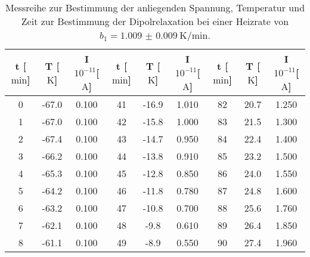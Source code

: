 \begin{table}
    \centering
    \caption{Messreihe zur Bestimmung der anliegenden Spannung, \newline Temperatur und Zeit zur Bestimmung der Dipolrelaxation bei einer Heizrate von $b_1 = \SI{1.009(9)}{\kelvin\per\minute}$.} 
    \label{tab:WhoIsBigInJapan?1}
    \begin{tabular}{c c c@{\hskip 0.5cm}||@{\hskip 0.5cm} c c c@{\hskip 0.5cm} ||@{\hskip 0.5cm} c c c}
        \toprule
        t [$\si{\minute}$] & T [$\si{\kelvin}$] &  I $10^{-11}$[$\si{\ampere}$] & t [$\si{\minute}$] & T [$\si{\kelvin}$] &  I $10^{-11}$[$\si{\ampere}$] & t [$\si{\minute}$] & T [$\si{\kelvin}$] &  I $10^{-11}$[$\si{\ampere}$] \\
        \midrule
0   &    -67.0      &     0.100   & 41  &    -16.9    &       1.010   &  82  &    20.7     &       1.250  \\ 
1   &    -67.0      &     0.100   & 42  &    -15.8    &       1.000   &  83  &    21.5     &       1.300  \\                                        
2   &    -67.4    &       0.100   & 43  &    -14.7    &       0.950   &  84  &    22.4     &       1.400   \\                                    
3   &    -66.2    &       0.100   & 44  &    -13.8    &       0.910   &  85  &    23.2     &       1.500   \\                                      
4   &    -65.3    &       0.100   & 45  &    -12.8    &       0.850   &  86  &    24.0     &       1.550  \\                                      
5   &    -64.2    &       0.100   & 46  &    -11.8    &       0.780   &  87  &    24.8     &       1.600   \\                                      
6   &    -63.2    &       0.100   & 47  &    -10.8    &       0.700    &  88  &    25.6     &       1.760  \\                                      
7   &    -62.1    &       0.100   & 48  &    -9.8     &       0.610   &  89  &    26.4     &       1.850  \\                                      
8   &    -61.1    &       0.100   & 49  &    -8.9     &       0.550   &  90  &    27.4     &       1.960  \\                                      

\end{tabular}
\end{table}
